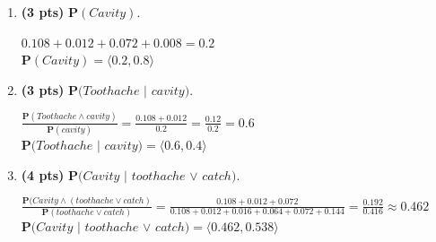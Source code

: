 \documentclass{article}
\begin{document}
\begin{enumerate}
\begin{enumerate}[label=($\alph*$)]


    \item \textbf{(3 pts)} $\mathbf{P}(Cavity)$.

    \color{blue}
        $0.108 + 0.012 + 0.072 + 0.008 = 0.2$\\
        $\mathbf{P}(Cavity) = \langle 0.2, 0.8 \rangle$
    \color{black}



    \item \textbf{(3 pts)} $\mathbf{P}(Toothache$ $|$ $cavity)$.

    \color{blue}
        $\frac{\mathbf{P}(Toothache \wedge cavity)}{\mathbf{P}(cavity)} = \frac{0.108 + 0.012}{0.2} = \frac{0.12}{0.2} = 0.6$\\
        $\mathbf{P}(Toothache$ $|$ $cavity) = \langle 0.6, 0.4 \rangle$
    \color{black}



    \item \textbf{(4 pts)} $\mathbf{P}(Cavity$ $|$ $toothache$ $\vee$ $catch)$.

    \color{blue}
        $\frac{\mathbf{P}(Cavity \wedge (toothache \vee catch)}{\mathbf{P}(toothache \vee catch)} = \frac{0.108 + 0.012 + 0.072}{0.108 + 0.012 + 0.016 + 0.064 + 0.072 + 0.144} = \frac{0.192}{0.416} \approx 0.462$\\
        $\mathbf{P}(Cavity$ $|$ $toothache$ $\vee$ $catch) = \langle 0.462, 0.538 \rangle$
    \color{black}

    
    \end{enumerate}


\end{enumerate}
\end{document}
